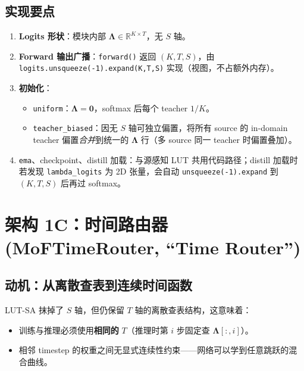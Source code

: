 \documentclass[11pt,a4paper]{article}
\newcommand{\R}{\mathbb{R}}
\begin{document}
\subsection{实现要点}

\begin{enumerate}
    \item \textbf{Logits 形状}：模块内部 $\bm{\Lambda} \in \R^{K \times T}$，无 $S$ 轴。
    \item \textbf{Forward 输出广播}：\texttt{forward()} 返回 $(K, T, S)$，由 \texttt{logits.unsqueeze(-1).expand(K,T,S)} 实现（视图，不占额外内存）。
    \item \textbf{初始化}：
        \begin{itemize}
            \item \texttt{uniform}：$\bm{\Lambda} = \mathbf{0}$，softmax 后每个 teacher $1/K$。
            \item \texttt{teacher\_biased}：因无 $S$ 轴可独立偏置，将所有 source 的 in-domain teacher 偏置\emph{合并}到统一的 $\bm{\Lambda}$ 行（多 source 同一 teacher 时偏置叠加）。
        \end{itemize}
    \item \texttt{ema}、checkpoint、distill 加载：与源感知 LUT 共用代码路径；distill 加载时若发现 \texttt{lambda\_logits} 为 2D 张量，会自动 \texttt{unsqueeze(-1).expand} 到 $(K, T, S)$ 后再过 softmax。
\end{enumerate}

\section{架构 1C：时间路由器 (MoFTimeRouter, ``Time Router'')}
\label{sec:time_router}

\subsection{动机：从离散查表到连续时间函数}

LUT-SA 抹掉了 $S$ 轴，但仍保留 $T$ 轴的离散查表结构，这意味着：

\begin{itemize}
    \item 训练与推理必须使用\textbf{相同的} $T$（推理时第 $i$ 步固定查 $\bm{\Lambda}[:, i]$）。
    \item 相邻 timestep 的权重之间无显式连续性约束——网络可以学到任意跳跃的混合曲线。
\end{itemize}
\end{document}
